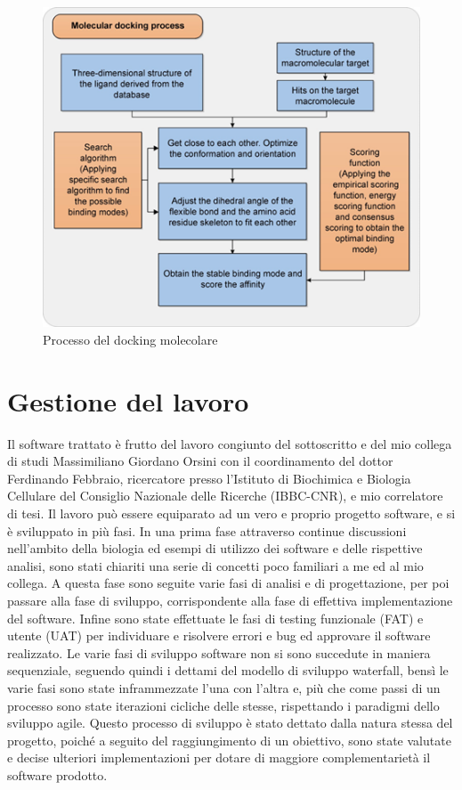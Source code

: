 \begin{figure}[H]
    \centering
    \includegraphics{immagini/capitolo1/processoDockingMolecolare.png}
    \caption{Processo del docking molecolare}
    \label{fig:processo del docking Molecolare}
\end{figure}

\section{Gestione del lavoro}
Il software trattato è frutto del lavoro congiunto del sottoscritto e del mio collega di studi Massimiliano Giordano Orsini con il coordinamento del dottor Ferdinando Febbraio, ricercatore presso l’Istituto di Biochimica e Biologia Cellulare del Consiglio Nazionale delle Ricerche (IBBC-CNR), e mio correlatore di tesi. Il lavoro può essere equiparato ad un vero e proprio progetto software, e si è sviluppato in più fasi. In una prima fase attraverso continue discussioni nell’ambito della biologia ed esempi di utilizzo dei software e delle rispettive analisi, sono stati chiariti una serie di concetti poco familiari a me ed al mio collega. A questa fase sono seguite varie fasi di analisi e di progettazione, per poi passare alla fase di sviluppo, corrispondente alla fase di effettiva implementazione del software. Infine sono state effettuate le fasi di testing funzionale (FAT) e utente (UAT) per individuare e risolvere errori e bug ed approvare il software realizzato. Le varie fasi di sviluppo software non si sono succedute in maniera sequenziale, seguendo quindi i dettami del modello di sviluppo waterfall, bensì le varie fasi sono state inframmezzate l’una con l’altra e, più che come passi di un processo sono state iterazioni cicliche delle stesse, rispettando i paradigmi dello sviluppo agile. Questo processo di sviluppo è stato dettato dalla natura stessa del progetto, poiché a seguito del raggiungimento di un obiettivo, sono state valutate e decise ulteriori implementazioni per dotare di maggiore complementarietà il software prodotto.

